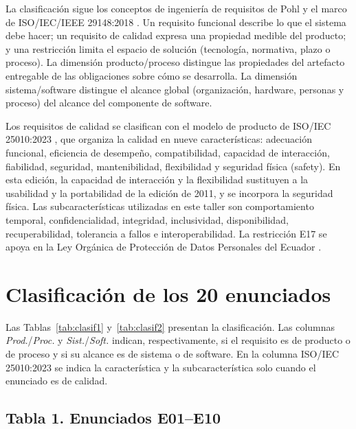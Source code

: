 \documentclass[11pt,a4paper]{article}
\begin{document}
La clasificación sigue los conceptos de ingeniería de requisitos de Pohl \cite{pohl2025} y el marco de ISO/IEC/IEEE 29148:2018 \cite{iso29148}. Un requisito funcional describe lo que el sistema debe hacer; un requisito de calidad expresa una propiedad medible del producto; y una restricción limita el espacio de solución (tecnología, normativa, plazo o proceso). La dimensión producto/proceso distingue las propiedades del artefacto entregable de las obligaciones sobre cómo se desarrolla. La dimensión sistema/software distingue el alcance global (organización, hardware, personas y proceso) del alcance del componente de software.

Los requisitos de calidad se clasifican con el modelo de producto de ISO/IEC 25010:2023 \cite{iso25010}, que organiza la calidad en nueve características: adecuación funcional, eficiencia de desempeño, compatibilidad, capacidad de interacción, fiabilidad, seguridad, mantenibilidad, flexibilidad y seguridad física (safety). En esta edición, la capacidad de interacción y la flexibilidad sustituyen a la usabilidad y la portabilidad de la edición de 2011, y se incorpora la seguridad física. Las subcaracterísticas utilizadas en este taller son comportamiento temporal, confidencialidad, integridad, inclusividad, disponibilidad, recuperabilidad, tolerancia a fallos e interoperabilidad. La restricción E17 se apoya en la Ley Orgánica de Protección de Datos Personales del Ecuador \cite{lopdp}.

\section{Clasificación de los 20 enunciados}

Las Tablas~\ref{tab:clasif1} y~\ref{tab:clasif2} presentan la clasificación. Las columnas \emph{Prod.}/\emph{Proc.} y \emph{Sist.}/\emph{Soft.} indican, respectivamente, si el requisito es de producto o de proceso y si su alcance es de sistema o de software. En la columna ISO/IEC 25010:2023 se indica la característica y la subcaracterística solo cuando el enunciado es de calidad.

\subsection*{Tabla 1. Enunciados E01--E10}
\end{document}
